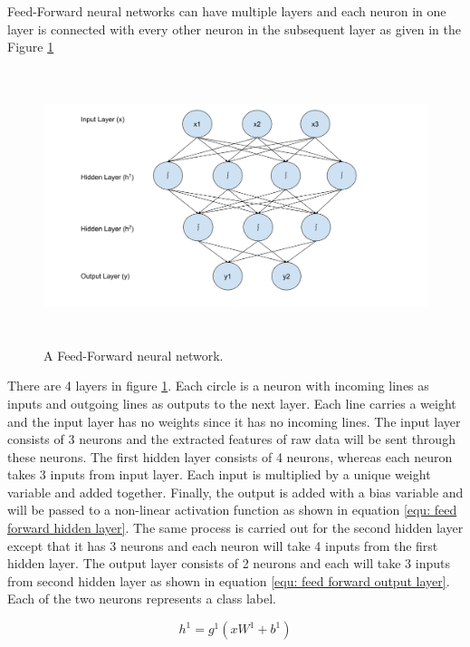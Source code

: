 \documentclass[a4paper, 11pt]{article}
\begin{document}
Feed-Forward neural networks \cite{Svozil1997} can have multiple layers and each neuron in one layer is connected with every other neuron in the subsequent layer as given in the Figure \ref{fig:Feed forward neural network}

\begin{figure}[htpb]
    \centering
    \includegraphics[width=\textwidth,height=8cm,keepaspectratio=true]
    {feed-forward-neural-network.png}
    \caption{
        A Feed-Forward neural network.
    }
    \label{fig:Feed forward neural network}
\end{figure}

There are 4 layers in figure \ref{fig:Feed forward neural network}. Each circle is a neuron with incoming lines as inputs and outgoing lines as outputs to the next layer. Each line carries a weight and the input layer has no weights since it has no incoming lines. The input layer consists of 3 neurons and the extracted features of raw data will be sent through these neurons. The first hidden layer consists of 4 neurons, whereas each neuron takes 3 inputs from input layer. Each input is multiplied by a unique weight variable and added together.  Finally, the output is added with a bias variable and will be passed to a non-linear activation function as shown in equation \ref{equ: feed forward hidden layer}. The same process is carried out for the second hidden layer except that it has 3 neurons and each neuron will take 4 inputs from the first hidden layer. The output layer consists of 2 neurons and each will take 3 inputs from second hidden layer as shown in equation \ref{equ: feed forward output layer}. Each of the two neurons represents a class label.

\begin{equation} \label{equ: feed forward hidden layer}
h^1 = g^1(xW^1 + b^1)
\end{equation}
\end{document}
